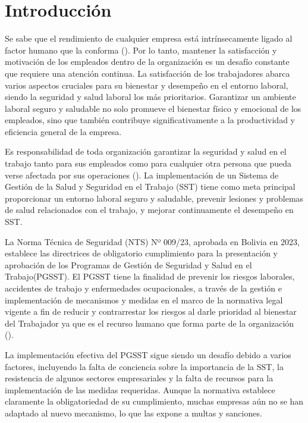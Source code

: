 \chapter{Introducción}
\label{sec:introduction}

Se sabe que el rendimiento de cualquier empresa está intrínsecamente ligado al factor humano que la conforma (\cite{krekel2019employee}). Por lo tanto, mantener la satisfacción y motivación de los empleados dentro de la organización es un desafío constante que requiere una atención continua. La satisfacción de los trabajadores abarca varios aspectos cruciales para su bienestar y desempeño en el entorno laboral, siendo la seguridad y salud laboral los más prioritarios. Garantizar un ambiente laboral seguro y saludable no solo promueve el bienestar físico y emocional de los empleados, sino que también contribuye significativamente a la productividad y eficiencia general de la empresa. \par
Es responsabilidad de toda organización garantizar la seguridad y salud en el trabajo tanto para sus empleados como para cualquier otra persona que pueda verse afectada por sus operaciones (\cite{Bolivia1979}). La implementación de un Sistema de Gestión de la Salud y Seguridad en el Trabajo (SST) tiene como meta principal proporcionar un entorno laboral seguro y saludable, prevenir lesiones y problemas de salud relacionados con el trabajo, y mejorar continuamente el desempeño en SST.\par
La Norma Técnica de Seguridad (NTS) Nº 009/23, aprobada en Bolivia en 2023, establece las directrices de obligatorio cumplimiento para la presentación y aprobación de los Programas de Gestión de Seguridad y Salud en el Trabajo(PGSST). El PGSST tiene la finalidad de prevenir los riesgos laborales, accidentes de trabajo y enfermedades ocupacionales, a través de la gestión e implementación de mecanismos y medidas en el marco de la normativa legal vigente a fin de reducir y contrarrestar los riesgos al darle prioridad al bienestar del Trabajador ya que es el recurso humano que forma parte de la organización (\cite{cahuasiquitadiseno}).\par
La implementación efectiva del PGSST sigue siendo un desafío debido a varios factores, incluyendo la falta de conciencia sobre la importancia de la SST, la resistencia de algunos sectores empresariales y la falta de recursos para la implementación de las medidas requeridas. Aunque la normativa establece claramente la obligatoriedad de su cumplimiento, muchas empresas aún no se han adaptado al nuevo mecanismo, lo que las expone a multas y sanciones.\par
